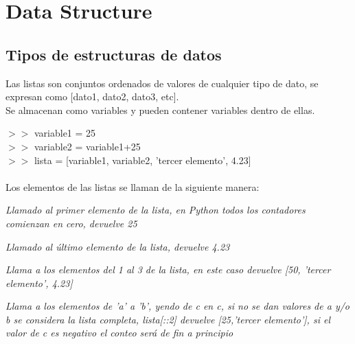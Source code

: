 \documentclass[10pt,a4paper]{article}
\begin{document}
\section{Data Structure}

\subsection{Tipos de estructuras de datos}

\begin{description}[
align=right,
labelindent = 1cm,
labelsep=0.5cm,
itemindent=0cm]

    \item [list] 
        Las listas son conjuntos ordenados de valores de cualquier tipo de dato, se expresan como [dato1, dato2, dato3, etc].\\
        Se almacenan como variables y pueden contener variables dentro de ellas.
    
        \noindent
        $>>$ variable1 = 25\\
        $>>$ variable2 = variable1+25\\
        $>>$ lista = [variable1, variable2, 'tercer elemento', 4.23]\\~\\
        
        Los elementos de las listas se llaman de la siguiente manera:
            
        \begin{description}[leftmargin=!,labelwidth=2.5cm,itemindent=0cm]
            \item [{$>>$ lista[0]}] \textit{Llamado al primer elemento de la lista, en Python todos los contadores comienzan en cero, devuelve 25}
            \item [{$>>$ lista[-1]}] \textit{Llamado al último elemento de la lista, devuelve 4.23}
            \item [{$>>$ lista[1:3]}] \textit{Llama a los elementos del 1 al 3 de la lista, en este caso devuelve \emph{[50, 'tercer elemento', 4.23]}}
            \item [{$>>$ lista[a:b:c]}] \textit{Llama a los elementos de 'a' a 'b', yendo de c en c, si no se dan valores de a y/o b se considera la lista completa, \emph{lista[::2]} devuelve \emph{[25,'tercer elemento']}, si el valor de c es negativo el conteo será de fin a principio}
        \end{description}
    

\end{description}
\end{document}
